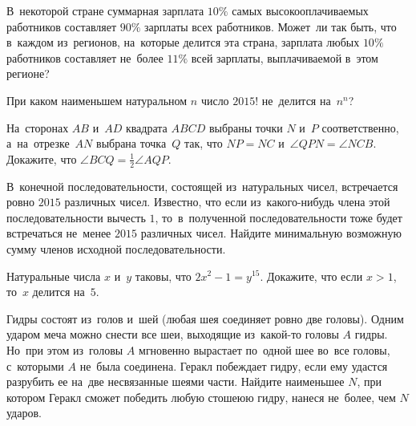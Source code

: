 \begin{problems}

\item
В~некоторой стране суммарная зарплата $10\%$ самых высокооплачиваемых
работников составляет $90\%$ зарплаты всех работников.
Может~ли так быть, что в~каждом из~регионов, на~которые делится эта страна,
зарплата любых $10\%$ работников составляет не~более $11\%$
всей зарплаты, выплачиваемой в~этом регионе?

\item
При каком наименьшем натуральном $n$ число $2015!$ не~делится на~$n^n$?

\item
На~сторонах $AB$ и~$AD$ квадрата $ABCD$ выбраны точки $N$ и~$P$ соответственно,
а~на~отрезке~$AN$ выбрана точка~$Q$ так, что $NP = NC$
и~$\angle QPN = \angle NCB$.
Докажите, что $\angle BCQ = \frac{1}{2} \angle AQP$.

\item
В~конечной последовательности, состоящей из~натуральных чисел, встречается
ровно $2015$ различных чисел.
Известно, что если из~какого-нибудь члена этой последовательности вычесть $1$,
то~в~полученной последовательности тоже будет встречаться не~менее $2015$
различных чисел.
Найдите минимальную возможную сумму членов исходной последовательности.

\item
Натуральные числа $x$ и~$y$ таковы, что $2 x^2 - 1 = y^{15}$.
Докажите, что если $x > 1$, то~$x$ делится на~$5$.

\end{problems}

\else


\additionalsection

\fi

\ifsecondpart

\begin{problems}

\item
Гидры состоят из~голов и~шей (любая шея соединяет ровно две головы).
Одним ударом меча можно снести все шеи, выходящие из~какой-то головы $A$ гидры. Но~при этом из~головы $A$ мгновенно вырастает по~одной шее во~все головы,
с~которыми $A$ не~была соединена.
Геракл побеждает гидру, если ему удастся разрубить ее на~две несвязанные шеями
части.
Найдите наименьшее $N$, при котором Геракл сможет победить любую стошеюю гидру,
нанеся не~более, чем $N$ ударов.

\end{problems}

\fi

